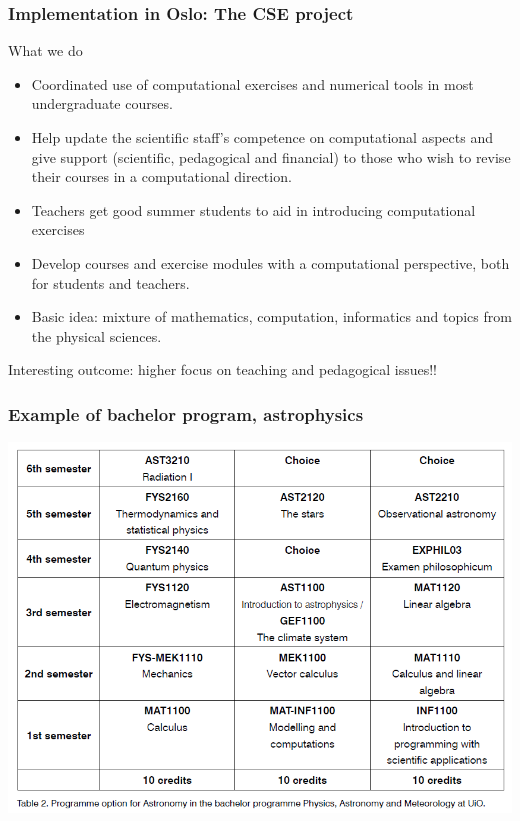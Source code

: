 \documentclass{beamer}
\begin{document}
\begin{frame}
\frametitle{Implementation in Oslo: The CSE  project}

\begin{block}{What we do }
\begin{itemize}
\item Coordinated use of computational exercises and numerical tools in most undergraduate courses.

\item Help update the scientific staff's competence on computational aspects and give support (scientific, pedagogical and financial)  to those who wish to revise  their courses in a computational direction.

\item Teachers get good summer students to aid in introducing computational exercises

\item Develop courses and exercise modules with a computational perspective, both for students and teachers. 

\item Basic idea: mixture of mathematics, computation, informatics and topics from the physical sciences.
\end{itemize}

\noindent
Interesting outcome: higher focus on teaching and pedagogical issues!!
\end{block}
\end{frame}

\begin{frame}
\frametitle{Example of bachelor program, astrophysics}

\begin{block}{}


\centerline{\includegraphics[width=0.6\linewidth]{figures/astronomy.png}}




\end{block}
\end{frame}
\end{document}
